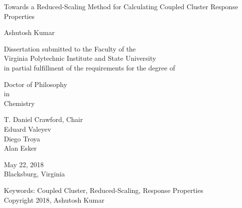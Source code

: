\documentclass[12pt]{report}
\begin{document}
\thispagestyle{empty}
\begin{center}

{\Large 
Towards a Reduced-Scaling Method for Calculating Coupled Cluster Response Properties
}

\vfill

Ashutosh Kumar

\vfill

Dissertation submitted to the Faculty of the \\
Virginia Polytechnic Institute and State University \\
in partial fulfillment of the requirements for the degree of

\vfill

Doctor of Philosophy \\
in \\
Chemistry

\vfill

T. Daniel Crawford, Chair \\
Eduard Valeyev \\
Diego Troya \\
Alan Esker

\vfill

May 22, 2018 \\
Blacksburg, Virginia

\vfill

Keywords: Coupled Cluster, Reduced-Scaling, Response Properties
\\
Copyright 2018, Ashutosh Kumar

\end{center}

\pagebreak
\end{document}
